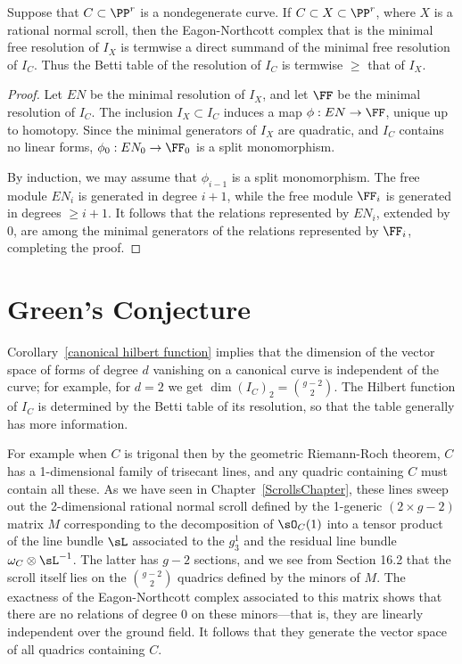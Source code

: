 \begin{proposition}
Suppose that $C\subset \PP^r$ is a nondegenerate curve. If $C\subset X \subset \PP^r$, where $X$ is a rational
normal scroll, then the Eagon-Northcott complex that is  the minimal free resolution of $I_X$ is termwise a direct summand
of the minimal free resolution of $I_C$. Thus the Betti table of the resolution of $I_C$ is termwise $\geq$ that of $I_X$.
\end{proposition}

\begin{proof}
Let $EN$ be the minimal resolution of $I_X$, and let $\FF$ be the minimal resolution of $I_C$.
The inclusion $I_X \subset I_C$ induces a map $\phi: EN\to \FF$, unique up to homotopy. Since the minimal generators of $I_X$ are quadratic, and $I_C$ contains no linear forms, $\phi_0: EN_0\to \FF_0$ is a split monomorphism.

By induction, we may assume that $\phi_{i-1}$ is a split monomorphism. The free module $EN_{i}$ is generated in 
degree $i+1$, while the free module $\FF_i$ is generated in degrees $\geq i+1$. It follows that the relations
represented by $EN_i$, extended by 0, are among the minimal generators of the relations represented by $\FF_i$,
completing the proof.
 \end{proof}
 
\section{Green's Conjecture}

Corollary~\ref{canonical hilbert function} implies that the dimension of the vector space of forms of degree $d$
vanishing on a canonical curve is independent of the curve; for example, for $d=2$ we get
$
\dim ({I_{C}})_{2} = {g-2\choose 2}.
$
The Hilbert function of $I_C$ is determined by the Betti table of its resolution, so that the table generally has more information.

 For example
when $C$ is trigonal then by the geometric Riemann-Roch theorem, $C$ has a 1-dimensional family of trisecant lines, and any quadric containing $C$ must contain all these. As we have seen in Chapter~\ref{ScrollsChapter}, these lines sweep
out the 2-dimensional rational normal scroll defined by the 1-generic $(2\times g-2)$ matrix $M$ corresponding to the decomposition of $\sO_C(1)$
into a tensor product of the  line bundle $\sL$ associated to the $g^{1}_{3}$ and the residual line bundle $\omega_{C}\otimes \sL^{-1}$. The latter has $g-2$ sections, and we see from Section 16.2
that the scroll itself lies on the ${g-2\choose 2}$ quadrics defined by the minors of $M$. The exactness of the Eagon-Northcott complex associated to this matrix shows that there are no relations of degree 0 on these minors---that is, they are linearly independent over the ground field. It follows that they generate the vector space of all quadrics containing $C$. 



